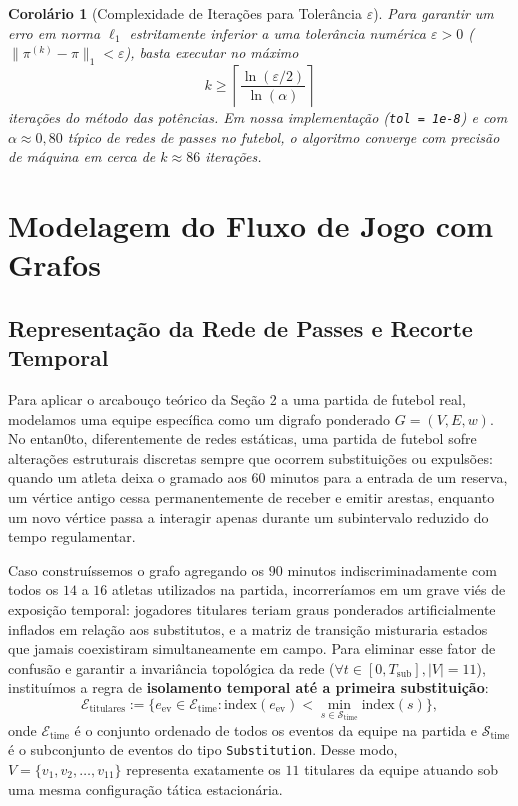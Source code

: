 \documentclass[10pt,a4paper]{article}
\theoremstyle{definition}
\theoremstyle{plain}
\newtheorem{corolario}[definicao]{Corolário}
\theoremstyle{remark}
\begin{document}
\begin{corolario}[Complexidade de Iterações para Tolerância $\varepsilon$]
Para garantir um erro em norma $\ell_1$ estritamente inferior a uma tolerância numérica $\varepsilon > 0$ ($\|\pi^{(k)} - \pi\|_1 < \varepsilon$), basta executar no máximo
\[
k \ge \left\lceil \frac{\ln(\varepsilon / 2)}{\ln(\alpha)} \right\rceil
\]
iterações do método das potências. Em nossa implementação (\texttt{tol = 1e-8}) e com $\alpha \approx 0{,}80$ típico de redes de passes no futebol, o algoritmo converge com precisão de máquina em cerca de $k \approx 86$ iterações.
\end{corolario}

\section{\sffamily Modelagem do Fluxo de Jogo com Grafos}

\subsection{\sffamily Representação da Rede de Passes e Recorte Temporal}

Para aplicar o arcabouço teórico da Seção 2 a uma partida de futebol real, modelamos uma equipe específica como um digrafo ponderado $G = (V, E, w)$. No entan0to, diferentemente de redes estáticas, uma partida de futebol sofre alterações estruturais discretas sempre que ocorrem substituições ou expulsões: quando um atleta deixa o gramado aos $60$ minutos para a entrada de um reserva, um vértice antigo cessa permanentemente de receber e emitir arestas, enquanto um novo vértice passa a interagir apenas durante um subintervalo reduzido do tempo regulamentar.

Caso construíssemos o grafo agregando os $90$ minutos indiscriminadamente com todos os $14$ a $16$ atletas utilizados na partida, incorreríamos em um grave viés de exposição temporal: jogadores titulares teriam graus ponderados artificialmente inflados em relação aos substitutos, e a matriz de transição misturaria estados que jamais coexistiram simultaneamente em campo. Para eliminar esse fator de confusão e garantir a invariância topológica da rede ($\forall t \in [0, T_{\text{sub}}], |V| = 11$), instituímos a regra de \textbf{isolamento temporal até a primeira substituição}:
\[
\mathcal{E}_{\text{titulares}} := \{ e_{\text{ev}} \in \mathcal{E}_{\text{time}} : \text{index}(e_{\text{ev}}) < \min_{s \in \mathcal{S}_{\text{time}}} \text{index}(s) \},
\]
onde $\mathcal{E}_{\text{time}}$ é o conjunto ordenado de todos os eventos da equipe na partida e $\mathcal{S}_{\text{time}}$ é o subconjunto de eventos do tipo \texttt{Substitution}. Desse modo, $V = \{v_1, v_2, \dots, v_{11}\}$ representa exatamente os $11$ titulares da equipe atuando sob uma mesma configuração tática estacionária.
\end{document}
